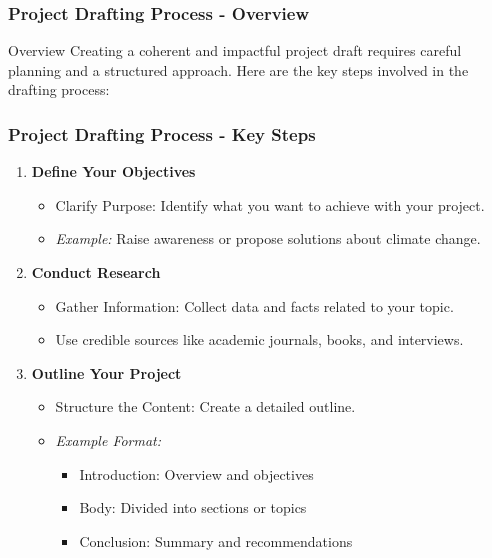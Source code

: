 \documentclass[aspectratio=169]{beamer}
\begin{document}
\begin{frame}[fragile]
    \frametitle{Project Drafting Process - Overview}
    \begin{block}{Overview}
        Creating a coherent and impactful project draft requires careful planning and a structured approach. Here are the key steps involved in the drafting process:
    \end{block}
\end{frame}

\begin{frame}[fragile]
    \frametitle{Project Drafting Process - Key Steps}
    \begin{enumerate}
        \item \textbf{Define Your Objectives}
            \begin{itemize}
                \item Clarify Purpose: Identify what you want to achieve with your project.
                \item \textit{Example:} Raise awareness or propose solutions about climate change.
            \end{itemize}
        
        \item \textbf{Conduct Research}
            \begin{itemize}
                \item Gather Information: Collect data and facts related to your topic.
                \item Use credible sources like academic journals, books, and interviews.
            \end{itemize}
        
        \item \textbf{Outline Your Project}
            \begin{itemize}
                \item Structure the Content: Create a detailed outline.
                \item \textit{Example Format:}
                    \begin{itemize}
                        \item Introduction: Overview and objectives
                        \item Body: Divided into sections or topics
                        \item Conclusion: Summary and recommendations
                    \end{itemize}
            \end{itemize}
    \end{enumerate}
\end{frame}
\end{document}
